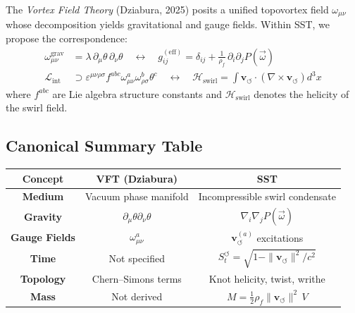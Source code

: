 \documentclass[10pt,reprint,aps,onecolumn,nofootinbib]{revtex4-2}
\begin{document}
        The \textit{Vortex Field Theory} (Dziabura, 2025) posits a unified topovortex field $\omega_{\mu\nu}$ whose decomposition yields gravitational and gauge fields. Within SST, we propose the correspondence:
        \begin{align}
            \omega_{\mu\nu}^{\text{grav}} &= \lambda\, \partial_\mu \theta \, \partial_\nu \theta \quad \longleftrightarrow \quad
            g_{ij}^{(\text{eff})} = \delta_{ij} + \frac{1}{\rho_{\!f}} \, \partial_i \partial_j P(\vec{\omega}) \\
            \mathcal{L}_{\text{int}} &\supset \varepsilon^{\mu\nu\rho\sigma} f^{abc} \omega^a_{\mu\nu} \omega^b_{\rho\sigma} \theta^c \quad \longleftrightarrow \quad \mathcal{H}_{\text{swirl}} = \int \mathbf{v}_{\!\boldsymbol{\circlearrowleft}} \cdot \left( \nabla \times \mathbf{v}_{\!\boldsymbol{\circlearrowleft}} \right) d^3x
        \end{align}
        where $f^{abc}$ are Lie algebra structure constants and $\mathcal{H}_{\text{swirl}}$ denotes the helicity of the swirl field.

    \subsection*{Canonical Summary Table}

        \begin{center}
            \renewcommand{\arraystretch}{1.25}
            \begin{tabular}{|c|c|c|}
                \hline
                \textbf{Concept} & \textbf{VFT (Dziabura)} & \textbf{SST} \\
                \hline
                \textbf{Medium} & Vacuum phase manifold & Incompressible swirl condensate \\
                \textbf{Gravity} & $\partial_\mu \theta \partial_\nu \theta$ & $\nabla_i \nabla_j P(\vec{\omega})$ \\
                \textbf{Gauge Fields} & $\omega_{\mu\nu}^{a}$ & $\mathbf{v}_{\!\boldsymbol{\circlearrowleft}}^{(a)}$ excitations \\
                \textbf{Time} & Not specified & $S_t^{\!\boldsymbol{\circlearrowleft}} = \sqrt{1 - \|\mathbf{v}_{\!\boldsymbol{\circlearrowleft}}\|^2 / c^2}$ \\
                \textbf{Topology} & Chern–Simons terms & Knot helicity, twist, writhe \\
                \textbf{Mass} & Not derived & $M = \frac{1}{2} \rho_{\!f} \|\mathbf{v}_{\!\boldsymbol{\circlearrowleft}}\|^2 \, V$ \\
                \hline
            \end{tabular}
        \end{center}
\end{document}
